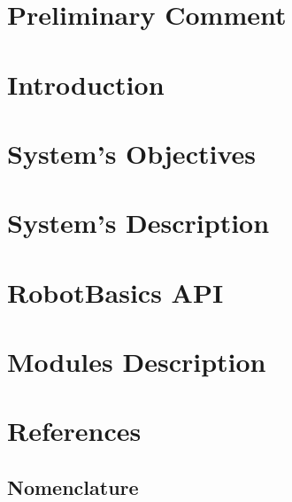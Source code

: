 \documentclass[11pt]{article}
\begin{document}


\setcounter{secnumdepth}{5}
\setcounter{tocdepth}{5}

\newpage
\tableofcontents
\newpage
{}

\section*{Preliminary Comment}
	
 	
\newpage

\section{Introduction}

	

\newpage
\section{System's Objectives}

	

\newpage
\section{System's Description}

	

\newpage
\section{RobotBasics API}

\newpage
\section{Modules Description}

\setcounter{secnumdepth}{0}
\renewcommand{\thesubsection}{\Alph{subsection}}

\newpage
{}
\setcounter{secnumdepth}{0}
\newpage
\section{References}

	\subsection{Nomenclature} \label{nomenclature}
		\printnomenclature
\end{document}
